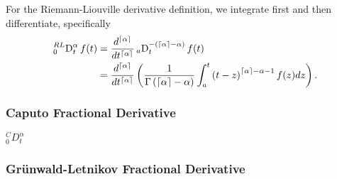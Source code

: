 For the Riemann-Liouville derivative definition, we integrate first and then differentiate, specifically 
\begin{align}
    \sideset{^{RL}_0}{^\alpha_t}\D f(t) &= \frac{d^{\lc \alpha \rc}}{dt^{\lc \alpha \rc}} \sideset{_a}{_t^{-\left( \lc \alpha \rc - \alpha \right)}}\D f(t) \\ 
    &= 
    \frac{d^{\lc \alpha \rc}}{dt^{\lc \alpha \rc}} \left( \frac{1}{\Gamma\left(\lc \alpha \rc - \alpha \right)} \int_a^t \left( t - z \right)^{\lc \alpha \rc - \alpha - 1} f(z) dz \right). 
  \label{eq:rldef}
\end{align}


\subsubsection{Caputo Fractional Derivative}
$^C_0D^\alpha_t$

\subsubsection{Gr\"unwald-Letnikov Fractional Derivative}
